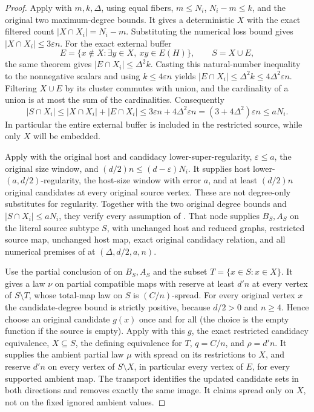 \begin{proof}
Apply  with $m,k,\Delta$, using equal
fibers, $m\leq N_i$, $N_i-m\leq k$, and the original two maximum-degree
bounds. It gives a deterministic $X$ with the exact filtered count
$|X\cap X_i|=N_i-m$. Substituting the numerical loss bound gives
$|X\cap X_i|\leq3\varepsilon n$. For the exact external buffer
\[
 E=\{x\notin X:\exists y\in X,\ xy\in E(H)\},\qquad S=X\cup E,
\]
the same theorem gives $|E\cap X_i|\leq\Delta^2k$. Casting this natural-number
inequality to the nonnegative scalars and using $k\leq4\varepsilon n$ yields
$|E\cap X_i|\leq\Delta^2k\leq4\Delta^2\varepsilon n$.
Filtering $X\cup E$ by its cluster commutes with union, and the cardinality
of a union is at most the sum of the cardinalities. Consequently
\[
 |S\cap X_i|\leq |X\cap X_i|+|E\cap X_i|
 \leq3\varepsilon n+4\Delta^2\varepsilon n
 =(3+4\Delta^2)\varepsilon n\leq aN_i.
\]
In particular the entire external buffer is
included in the restricted source, while only $X$ will be embedded.

Apply  with the original
host and candidacy lower-super-regularity, $\varepsilon\leq a$,
the original size window, and $(d/2)n\leq(d-\varepsilon)N_i$.
It supplies host lower-$(a,d/2)$-regularity, the host-size window
with error $a$, and at least $(d/2)n$ original candidates at every
original source vertex. These are not degree-only substitutes for
regularity. Together with the two original degree bounds and
$|S\cap X_i|\leq aN_i$, they verify every assumption of
. That node supplies $B_S,A_S$
on the literal source subtype $S$, with unchanged host and reduced
graphs, restricted source map, unchanged host map, exact original
candidacy relation, and all numerical premises of
 at $(\Delta,d/2,a,n)$.

Use the partial conclusion of  on $B_S,A_S$
and the subset $T=\{x\in S:x\in X\}$. It gives a law $\nu$ on partial
compatible maps with reserve at least $d'n$ at every vertex of
$S\setminus T$, whose total-map law on $S$ is $(C/n)$-spread.
For every original vertex $x$ the candidate-degree bound is strictly
positive, because $d/2>0$ and $n\geq4$. Hence choose an original candidate
$g(x)$ once and for all (the choice is the empty function if the source
is empty). Apply  with
this $g$, the exact restricted candidacy equivalence, $X\subseteq S$,
the defining equivalence for $T$, $q=C/n$, and $\rho=d'n$.
It supplies the ambient partial law $\mu$ with spread on its restrictions
to $X$, and reserve $d'n$ on every vertex of $S\setminus X$, in particular
every vertex of $E$, for every supported ambient map. The transport
identifies the updated candidate sets in both directions and removes
exactly the same image. It claims spread only on $X$, not on the fixed
ignored ambient values.


\end{proof}
